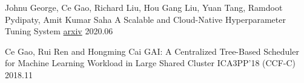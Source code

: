 
\begin{cventries}

  \cventry
    {Johnu George, Ce Gao, Richard Liu, Hou Gang Liu, Yuan Tang, Ramdoot Pydipaty, Amit Kumar Saha} %
    {A Scalable and Cloud-Native Hyperparameter Tuning System} %
    {\href{https://arxiv.org/abs/2006.02085}{arxiv}} %
    {2020.06} %
    {
    }

  \cventry
    {Ce Gao, Rui Ren and Hongming Cai} %
    {GAI: A Centralized Tree-Based Scheduler for Machine Learning Workload in Large Shared Cluster} %
    {ICA3PP'18 (CCF-C)} %
    {2018.11} %
    {
    }


\end{cventries}
